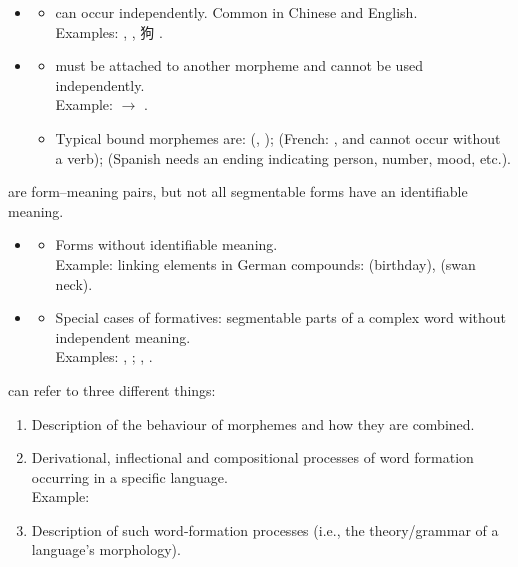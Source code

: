 \documentclass[a4paper,landscape,headrule,footrule]{foils}
\newcommand{\zh}[1]{{\cjkfont #1}}
\begin{document}
  \begin{itemize}
  \item {}
  \begin{itemize}
    \item {} can occur independently. Common in Chinese and English.\\
          Examples: , , \zh{狗} .
  \end{itemize}
  \medskip
  \item {}
  \begin{itemize}
    \item {} must be attached to another morpheme and cannot be used independently.\\
          Example: \txx{[number pl]}  $\rightarrow$ .
    \item Typical bound morphemes are:  (, );  (French: ,  and  cannot occur without a verb);  (Spanish  needs an ending indicating person, number, mood, etc.).
    \end{itemize}
  \end{itemize}

   are form–meaning pairs, but not all segmentable forms have an identifiable meaning.
  \begin{itemize}
  \item {}
    \begin{itemize}
    \item Forms without identifiable meaning.\\
      Example: linking elements in German compounds:  (birthday),  (swan neck).
    \end{itemize}
  \item {}
    \begin{itemize}
    \item Special cases of formatives: segmentable parts of a complex word without independent meaning.\\
      Examples: , ; , .
    \end{itemize}
  \end{itemize}


   can refer to three different things:
  \begin{enumerate}
    \item Description of the behaviour of morphemes and how they are combined.
    \item Derivational, inflectional and compositional processes of word formation occurring in a specific language.\\
          Example: 
    \item Description of such word-formation processes (i.e., the theory/grammar of a language’s morphology).
    \end{enumerate}
\end{document}
